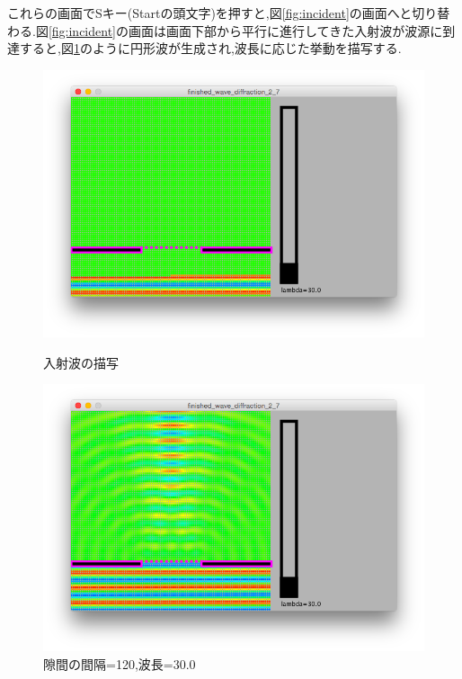 これらの画面でSキー(Startの頭文字)を押すと,図\ref{fig:incident}の画面へと切り替わる.図\ref{fig:incident}の画面は画面下部から平行に進行してきた入射波が波源に到達すると,図\ref{fig:diffraction1}のように円形波が生成され,波長に応じた挙動を描写する.
\begin{figure}[H]
\begin{minipage}{0.5\hsize}
\begin{center}
\includegraphics[width=\linewidth]
  {../result/diffraction1.png}
\caption{入射波の描写}
\label{fig:incident}
\end{center}
\end{minipage}%
\begin{minipage}{0.5\hsize}
\begin{center}
\includegraphics[width=\linewidth]
  {../result/diffraction2.png}
\caption{隙間の間隔=120,波長=30.0}
\label{fig:diffraction1}
\end{center}
\end{minipage}
\end{figure}


